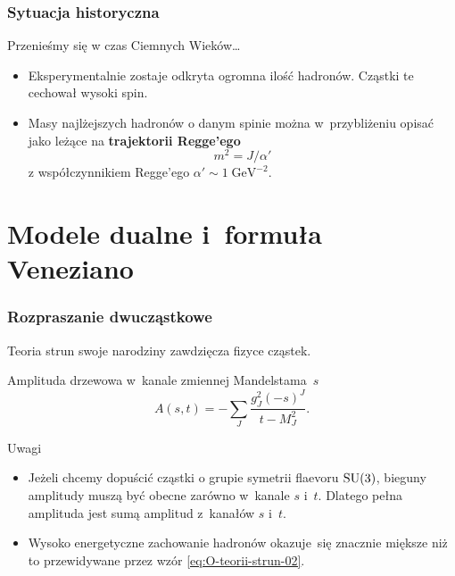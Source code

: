 \documentclass[10pt,t]{beamer}
\begin{document}
\begin{frame}
  \frametitle{Sytuacja historyczna}


  Przenieśmy się w czas Ciemnych Wieków\ldots
  \begin{itemize}

  \item Eksperymentalnie zostaje odkryta ogromna ilość hadronów.
    Cząstki te cechował wysoki spin.

  \item Masy najlżejszych hadronów o danym spinie można w~przybliżeniu
    opisać jako leżące na \textbf{trajektorii Regge’ego}
    \begin{equation}
      \label{eq:O-teorii-strun-01}
      m^{ 2 } = J / \alpha'
    \end{equation}
    z współczynnikiem Regge’ego
    $\alpha' \sim 1\; \mathrm{GeV}^{ -2 }$.

  \end{itemize}

\end{frame}










\section{Modele dualne i~formuła Veneziano}



\begin{frame}
  \frametitle{Rozpraszanie dwucząstkowe}


  Teoria strun swoje narodziny zawdzięcza fizyce cząstek.

  Amplituda drzewowa w~kanale zmiennej Mandelstama~$s$
  \begin{equation}
    \label{eq:O-teorii-strun-02}
    A( s, t ) =
    -\sum_{ J } \frac{ g^{ 2 }_{ J } ( -s )^{ J } }{ t - M^{ 2 }_{ J } }.
  \end{equation}

  Uwagi
  \begin{itemize}

  \item Jeżeli chcemy dopuścić cząstki o grupie symetrii flaevoru
    $\mathrm{SU}( 3 )$, bieguny amplitudy muszą być obecne zarówno w~kanale
    $s$ i~$t$. Dlatego pełna amplituda jest sumą amplitud z~kanałów
    $s$ i~$t$.

  \item Wysoko energetyczne zachowanie hadronów okazuje~się znacznie
    miększe niż to przewidywane przez wzór \eqref{eq:O-teorii-strun-02}.

  \end{itemize}

\end{frame}
\end{document}
